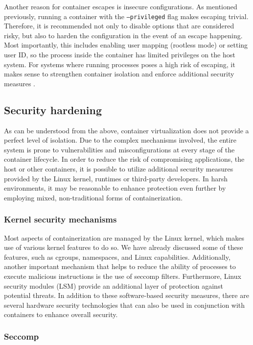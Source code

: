 Another reason for container escapes is insecure configurations. As mentioned previously, running a container with the \texttt{--privileged} flag makes escaping trivial. Therefore, it is recommended not only to disable options that are considered risky, but also to harden the configuration in the event of an escape happening. Most importantly, this includes enabling user mapping (rootless mode) or setting user ID, so the process inside the container has limited privileges on the host system. For systems where running processes poses a high risk of escaping, it makes sense to strengthen container isolation and enforce additional security measures \cite{book:rice}.

\clearpage
\subsection{Security hardening}

As can be understood from the above, container virtualization does not provide a perfect level of isolation. Due to the complex mechanisms involved, the entire system is prone to vulnerabilities and misconfigurations at every stage of the container lifecycle. In order to reduce the risk of compromising applications, the host or other containers, it is possible to utilize additional security measures provided by the Linux kernel, runtimes or third-party developers. In harsh environments, it may be reasonable to enhance protection even further by employing mixed, non-traditional forms of containerization.

\subsubsection{Kernel security mechanisms}

Most aspects of containerization are managed by the Linux kernel, which makes use of various kernel features to do so. We have already discussed some of these features, such as cgroups, namespaces, and Linux capabilities. Additionally, another important mechanism that helps to reduce the ability of processes to execute malicious instructions is the use of seccomp filters. Furthermore, Linux security modules (LSM) provide an additional layer of protection against potential threats. In addition to these software-based security measures, there are several hardware security technologies that can also be used in conjunction with containers to enhance overall security.

\subsubsection*{Seccomp}

